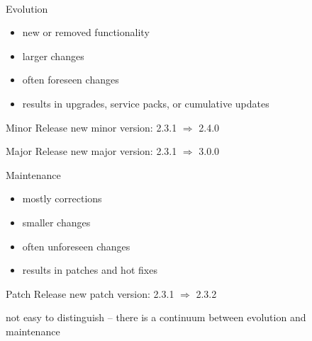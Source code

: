 \begin{frame}{\myframetitle\ \mytitlesource{\ludewiglichter}}
	\begin{fancycolumns}[t]
		\begin{definition}{Evolution}
			\begin{itemize}
				\item new or removed functionality
				\item larger changes
				\item often foreseen changes
				\item results in upgrades, service packs, or cumulative updates
			\end{itemize}
		\end{definition}
		\begin{example}{Minor Release}
			new minor version: 2.3.1 $\Rightarrow$ 2.4.0
		\end{example}
		\begin{example}{Major Release}
			new major version: 2.3.1 $\Rightarrow$ 3.0.0
		\end{example}
	\nextcolumn
		\begin{definition}{Maintenance}
			\begin{itemize}
				\item mostly corrections
				\item smaller changes
				\item often unforeseen changes
				\item results in patches and hot fixes
			\end{itemize}
		\end{definition}
		\begin{example}{Patch Release}
			new patch version: 2.3.1 $\Rightarrow$ 2.3.2
		\end{example}
	\end{fancycolumns}
	\pause\pause\begin{note}{}
		\centering not easy to distinguish -- there is a continuum between evolution and maintenance
	\end{note}
\end{frame}

